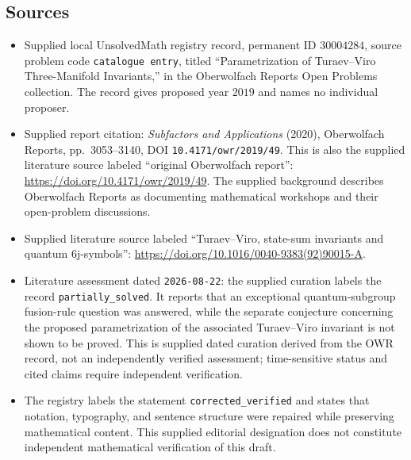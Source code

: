 \documentclass[11pt]{article}
\begin{document}
\subsection{Sources}
\begin{itemize}
\item Supplied local UnsolvedMath registry record, permanent ID \(30004284\), source problem code \texttt{catalogue entry}, titled ``Parametrization of Turaev--Viro Three-Manifold Invariants,'' in the Oberwolfach Reports Open Problems collection. The record gives proposed year \(2019\) and names no individual proposer.
\item Supplied report citation: \emph{Subfactors and Applications} (2020), Oberwolfach Reports, pp.~3053--3140, DOI \texttt{10.4171/owr/2019/49}. This is also the supplied literature source labeled ``original Oberwolfach report'': \url{https://doi.org/10.4171/owr/2019/49}. The supplied background describes Oberwolfach Reports as documenting mathematical workshops and their open-problem discussions.
\item Supplied literature source labeled ``Turaev--Viro, state-sum invariants and quantum 6j-symbols'': \url{https://doi.org/10.1016/0040-9383(92)90015-A}.
\item Literature assessment dated \texttt{2026-08-22}: the supplied curation labels the record \texttt{partially\_solved}. It reports that an exceptional quantum-subgroup fusion-rule question was answered, while the separate conjecture concerning the proposed parametrization of the associated Turaev--Viro invariant is not shown to be proved. This is supplied dated curation derived from the OWR record, not an independently verified assessment; time-sensitive status and cited claims require independent verification.
\item The registry labels the statement \texttt{corrected\_verified} and states that notation, typography, and sentence structure were repaired while preserving mathematical content. This supplied editorial designation does not constitute independent mathematical verification of this draft.
\end{itemize}
\end{document}
